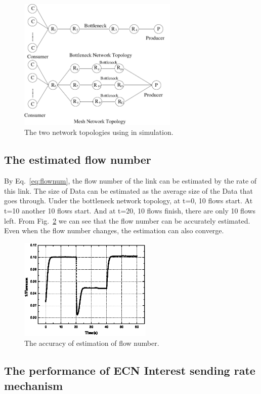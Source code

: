 \begin{figure}[t]
\centering
\includegraphics[width=3in]{topology.pdf}
\caption{The two network topologies using in simulation.}
\label{fig-topology}
\end{figure}

\subsection{The estimated flow number}

By Eq.~\ref{eq:flownum}, the flow number of the link can be estimated by the rate of this link. The size of Data can be estimated as the average size of the Data that goes through. Under the bottleneck network topology, at t=0, 10 flows start. At t=10 another 10 flows start. And at t=20, 10 flows finish, there are only 10 flows left. From Fig.~\ref{fig-flownum} we can see that the flow number can be accurately estimated. Even when the flow number changes, the estimation can also converge.

\begin{figure}[t]
\centering
\includegraphics[width=2.5in]{flownum-pic-cut.eps}
\caption{The accuracy of estimation of flow number.}
\label{fig-flownum}
\end{figure}

\subsection{The performance of ECN Interest sending rate mechanism}

